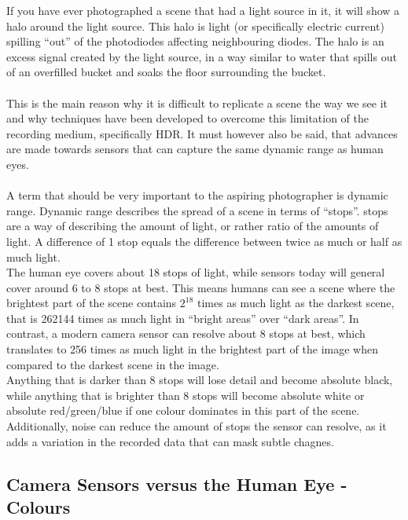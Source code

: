 If you have ever photographed a scene that had a light source in it, it will show a halo around the light source. This halo is light (or specifically electric current) spilling ``out'' of the photodiodes affecting neighbouring diodes. The halo is an excess signal created by the light source, in a way similar to water that spills out of an overfilled bucket and soaks the floor surrounding the bucket.
\\
\\
This is the main reason why it is difficult to replicate a scene the way we see it and why techniques have been developed to overcome this limitation of the recording medium, specifically \gls{HDR}. It must however also be said, that advances are made towards \glspl{sensor} that can capture the same dynamic range as human eyes.
\\
\\
A term that should be very important to the aspiring photographer is dynamic range. Dynamic range describes the spread of a scene in terms of ``\glspl{stop}''. \Glspl{stop} are a way of describing the amount of light, or rather ratio of the amounts of light. A difference of 1 stop equals the difference between twice as much or half as much light.
\\
The human eye covers about 18 \glspl{stop} of light, while \glspl{sensor} today will general cover around 6 to 8 \glspl{stop} at best. This means humans can see a scene where the brightest part of the scene contains $2^{18}$ times as much light as the darkest scene, that is 262144 times as much light in ``bright areas'' over ``dark areas''. In contrast, a modern camera sensor can resolve about 8 \glspl{stop} at best, which translates to 256 times as much light in the brightest part of the image when compared to the darkest scene in the image.
\\
Anything that is darker than 8 \glspl{stop} will lose detail and become absolute black, while anything that is brighter than 8 \glspl{stop} will become absolute white or absolute red/green/blue if one colour dominates in this part of the scene.
\\
Additionally, noise can reduce the amount of \glspl{stop} the sensor can resolve, as it adds a variation in the recorded data that can mask subtle chagnes.


\subsection{Camera Sensors versus the Human Eye - Colours}

